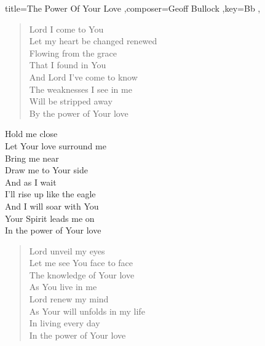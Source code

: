 \documentclass[]{leadsheet}
\begin{document}
\begin{song}{title={The Power Of Your Love
},composer={Geoff Bullock
},key={Bb
},}
\begin{verse}
Lord I come to You \\
Let my heart be changed renewed \\
Flowing from the grace \\
That I found in You \\
And Lord I've come to know \\
The weaknesses I see in me \\
Will be stripped away \\
By the power of Your love \\
\end{verse}

\begin{chorus}
Hold me close \\
Let Your love surround me \\
Bring me near \\
Draw me to Your side \\
And as I wait \\
I'll rise up like the eagle \\
And I will soar with You \\
Your Spirit leads me on \\
In the power of Your love \\
\end{chorus}

\begin{verse}
Lord unveil my eyes \\
Let me see You face to face \\
The knowledge of Your love \\
As You live in me \\
Lord renew my mind \\
As Your will unfolds in my life \\
In living every day \\
In the power of Your love \\
\end{verse}

\end{song}
\end{document}
